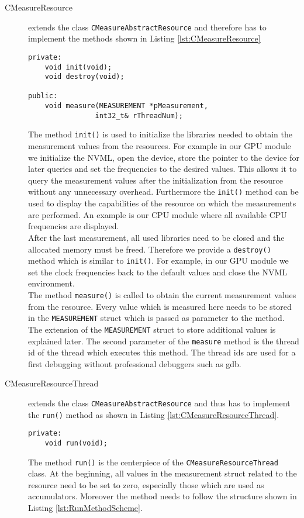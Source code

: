 \begin{description}
\pagebreak
	
	\item[CMeasureResource] extends the class \texttt{CMeasureAbstractResource} and therefore has to implement the methods shown in Listing \ref{lst:CMeasureResource} 
	\begin{lstlisting}[caption={Methods of the \texttt{CMeasureResource} class that programmers have to implement in order to support a new resource.}, label=lst:CMeasureResource]
private:
	void init(void);
	void destroy(void);
	
public:
	void measure(MEASUREMENT *pMeasurement, 
				int32_t& rThreadNum);
	\end{lstlisting}
	The method \texttt{init()} is used to initialize the libraries needed to obtain the measurement values from the resources. For example in our GPU module we initialize the NVML, open the device, store the pointer to the device for later queries and set the frequencies to the desired values. This allows it to query the measurement values after the initialization from the resource without any unnecessary overhead. Furthermore the \texttt{init()} method can be used to display the capabilities of the resource on which the measurements are performed. An example is our CPU module where all available CPU frequencies are displayed.\\
	After the last measurement, all used libraries need to be closed and the allocated memory must be freed. Therefore we provide a \texttt{destroy()} method which is similar to \texttt{init()}. For example, in our GPU module we set the clock frequencies back to the default values and close the NVML environment.\\
	The method \texttt{measure()} is called to obtain the current measurement values from the resource. Every value which is measured here needs to be stored in the \texttt{MEASUREMENT} struct which is passed as parameter to the method. The extension of the \texttt{MEASUREMENT} struct to store additional values is explained later. The second parameter of the \texttt{measure} method is the thread id of the thread which executes this method. The thread ids are used for a first debugging without professional debuggers such as gdb.
	 
	\item[CMeasureResourceThread] extends the class \texttt{CMeasureAbstractResource} and thus has to implement the \texttt{run()} method as shown in Listing \ref{lst:CMeasureResourceThread}.
	\begin{lstlisting}[caption={Methods of the \texttt{CMeasureResourceThread} class that programmers have to implement in order to support a new resource.}, label=lst:CMeasureResourceThread]
private:
	void run(void);
	\end{lstlisting}
	The method \texttt{run()} is the centerpiece of the \texttt{CMeasureResourceThread} class. At the beginning, all values in the measurement struct related to the resource need to be set to zero, especially those which are used as accumulators. Moreover the method needs to follow the structure shown in Listing \ref{lst:RunMethodScheme}.
	

\end{description}
